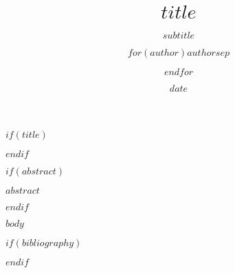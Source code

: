 \documentclass{beamer}
\title{$title$}
\subtitle{$subtitle$}
\author{$for(author)$$author$$sep$ \and $endfor$}
\date{$date$}
\begin{document}
$if(title)$
\begin{frame}
\titlepage
\end{frame}
$endif$

$if(abstract)$
\begin{frame}
$abstract$
\end{frame}
$endif$

$body$

$if(bibliography)$


$endif$
\end{document}
